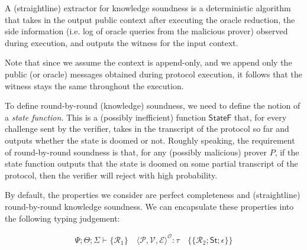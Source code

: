 A (straightline) extractor for knowledge soundness is a deterministic algorithm that takes in the output public context after executing the oracle reduction, the side information (i.e. log of oracle queries from the malicious prover) observed during execution, and outputs the witness for the input context.

Note that since we assume the context is append-only, and we append only the public (or oracle)
messages obtained during protocol execution, it follows that the witness stays the same throughout
the execution.

\begin{definition}
    \label{def:knowledge_soundness}
\end{definition}

To define round-by-round (knowledge) soundness, we need to define the notion of a \emph{state function}. This is a (possibly inefficient) function $\mathsf{StateF}$ that, for every challenge sent by the verifier, takes in the transcript of the protocol so far and outputs whether the state is doomed or not. Roughly speaking, the requirement of round-by-round soundness is that, for any (possibly malicious) prover $P$, if the state function outputs that the state is doomed on some partial transcript of the protocol, then the verifier will reject with high probability.

\begin{definition}
    \label{def:state_function}
\end{definition}

\begin{definition}
    \label{def:round_by_round_soundness}
\end{definition}

\begin{definition}
    \label{def:round_by_round_knowledge_soundness}
\end{definition}

By default, the properties we consider are perfect completeness and (straightline) round-by-round knowledge soundness. We can encapsulate these properties into the following typing judgement:

\begin{align*}
    \Psi; \Theta; \varSigma \vdash \{\mathcal{R}_1\} \quad \langle\mathcal{P}, \mathcal{V}, \mathcal{E}\rangle^{\mathcal{O}} : \tau \quad \{\!\{\mathcal{R}_2; \mathsf{St}; \epsilon\}\!\}
\end{align*}

